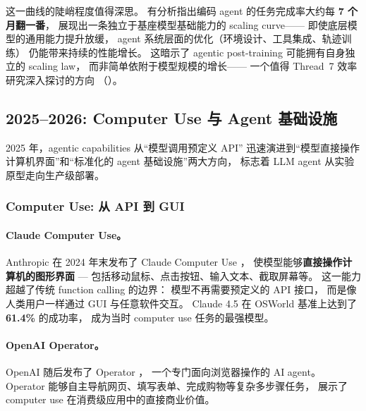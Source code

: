 这一曲线的陡峭程度值得深思。
有分析指出编码 agent 的任务完成率大约每 \textbf{7 个月翻一番}，
展现出一条独立于基座模型基础能力的 scaling curve——
即使底层模型的通用能力提升放缓，
agent 系统层面的优化（环境设计、工具集成、轨迹训练）
仍能带来持续的性能增长。
这暗示了 agentic post-training 可能拥有自身独立的 scaling law，
而非简单依附于模型规模的增长——
一个值得 Thread~7 效率研究深入探讨的方向
（）。



\subsection{2025--2026: Computer Use 与 Agent 基础设施}
\label{sec:t6-computer-use}

2025 年，agentic capabilities 从``模型调用预定义 API''
迅速演进到``模型直接操作计算机界面''和``标准化的 agent 基础设施''两大方向，
标志着 LLM agent 从实验原型走向生产级部署。

\subsubsection{Computer Use: 从 API 到 GUI}

\paragraph{Claude Computer Use。}
Anthropic 在 2024 年末发布了 Claude Computer Use \cite{anthropic2024computeruse}，
使模型能够\textbf{直接操作计算机的图形界面} ---
包括移动鼠标、点击按钮、输入文本、截取屏幕等。
这一能力超越了传统 function calling 的边界：
模型不再需要预定义的 API 接口，
而是像人类用户一样通过 GUI 与任意软件交互。
Claude 4.5 \cite{anthropic2025claude45} 在 OSWorld 基准上达到了 \textbf{61.4\%} 的成功率，
成为当时 computer use 任务的最强模型。

\paragraph{OpenAI Operator。}
OpenAI 随后发布了 Operator \cite{openai2025operator}，
一个专门面向浏览器操作的 AI agent。
Operator 能够自主导航网页、填写表单、完成购物等复杂多步骤任务，
展示了 computer use 在消费级应用中的直接商业价值。

